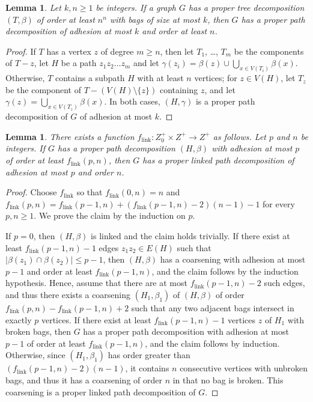 \documentclass[12pt]{article}
\newtheorem{lemma}[theorem]{Lemma}
\begin{document}
\begin{lemma}\label{lemma-tree-to-path}
Let $k,n\ge 1$ be integers.  If a graph $G$ has a proper tree decomposition $(T,\beta)$ of order at least $n^n$ with bags of size at most $k$, then
$G$ has a proper path decomposition of adhesion at most $k$ and order at least $n$.
\end{lemma}
\begin{proof}
If $T$ has a vertex $z$ of degree $m\ge n$, then let $T_1$, \ldots, $T_m$ be the components of $T-z$, let $H$ be a path $z_1z_2\ldots z_m$
and let $\gamma(z_i)=\beta(z)\cup \bigcup_{x\in V(T_i)} \beta(x)$.  Otherwise, $T$ contains a subpath $H$ with at least $n$ vertices; for $z\in V(H)$,
let $T_z$ be the component of $T-(V(H)\setminus\{z\})$ containing $z$, and let $\gamma(z)=\bigcup_{x\in V(T_z)} \beta(x)$.
In both cases, $(H,\gamma)$ is a proper path decomposition of $G$ of adhesion at most $k$.
\end{proof}

\begin{lemma}\label{lemma-linked}
There exists a function $f_{\text{link}}:Z^+_0\times Z^+\to Z^+$ as follows.
Let $p$ and $n$ be integers.  If $G$ has a proper path decomposition $(H,\beta)$ with adhesion at most $p$ of order at least $f_{\text{link}}(p,n)$,
then $G$ has a proper linked path decomposition of adhesion at most $p$ and order $n$.
\end{lemma}
\begin{proof}
Choose $f_{\text{link}}$ so that $f_{\text{link}}(0,n)=n$ and $f_{\text{link}}(p,n)=f_{\text{link}}(p-1,n)+(f_{\text{link}}(p-1,n)-2)(n-1)-1$
for every $p,n\ge 1$.  We prove the claim by the induction on $p$.

If $p=0$, then $(H,\beta)$ is linked and the claim holds trivially.
If there exist at least $f_{\text{link}}(p-1,n)-1$ edges $z_1z_2\in E(H)$ such that $|\beta(z_1)\cap \beta(z_2)|\le p-1$, then $(H,\beta)$ has
a coarsening with adhesion at most $p-1$ and order at least $f_{\text{link}}(p-1,n)$, and the claim follows by the induction hypothesis.
Hence, assume that there are at most $f_{\text{link}}(p-1,n)-2$ such edges, and thus there exists a coarsening $(H_1,\beta_1)$ of $(H,\beta)$
of order $f_{\text{link}}(p,n)-f_{\text{link}}(p-1,n)+2$ such that any two adjacent bags intersect in exactly $p$ vertices.  If there exist at least
$f_{\text{link}}(p-1,n)-1$ vertices $z$ of $H_1$ with broken bags, then $G$ has a proper path decomposition with adhesion at most $p-1$ of order
at least $f_{\text{link}}(p-1,n)$, and the claim follows by induction.  Otherwise, since $(H_1,\beta_1)$ has order greater than $(f_{\text{link}}(p-1,n)-2)(n-1)$,
it contains $n$ consecutive vertices with unbroken bags, and thus it has a coarsening of order $n$ in that no bag is broken.
This coarsening is a proper linked path decomposition of $G$.
\end{proof}
\end{document}
